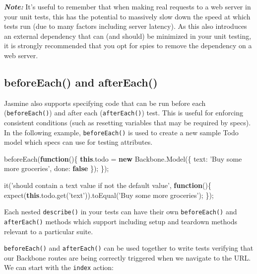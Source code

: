 \documentclass[9pt]{book}
\newenvironment{Shaded}{}{}
\newcommand{\KeywordTok}[1]{\textcolor[rgb]{0.00,0.44,0.13}{\textbf{{#1}}}}
\newcommand{\DataTypeTok}[1]{\textcolor[rgb]{0.56,0.13,0.00}{{#1}}}
\newcommand{\StringTok}[1]{\textcolor[rgb]{0.25,0.44,0.63}{{#1}}}
\newcommand{\OtherTok}[1]{\textcolor[rgb]{0.00,0.44,0.13}{{#1}}}
\newcommand{\FunctionTok}[1]{\textcolor[rgb]{0.02,0.16,0.49}{{#1}}}
\newcommand{\NormalTok}[1]{{#1}}
\begin{document}
\textbf{\emph{Note:}} It's useful to remember that when making real
requests to a web server in your unit tests, this has the potential to
massively slow down the speed at which tests run (due to many factors
including server latency). As this also introduces an external
dependency that can (and should) be minimized in your unit testing, it
is strongly recommended that you opt for spies to remove the dependency
on a web server.

\subsection{beforeEach() and
afterEach()}\label{beforeeach-and-aftereach}

Jasmine also supports specifying code that can be run before each
(\texttt{beforeEach()}) and after each (\texttt{afterEach()}) test. This
is useful for enforcing consistent conditions (such as resetting
variables that may be required by specs). In the following example,
\texttt{beforeEach()} is used to create a new sample Todo model which
specs can use for testing attributes.

\begin{Shaded}
\begin{Highlighting}[]
\FunctionTok{beforeEach}\NormalTok{(}\KeywordTok{function}\NormalTok{()\{}
   \KeywordTok{this}\NormalTok{.}\FunctionTok{todo} \NormalTok{= }\KeywordTok{new} \OtherTok{Backbone}\NormalTok{.}\FunctionTok{Model}\NormalTok{(\{}
      \DataTypeTok{text}\NormalTok{: }\StringTok{'Buy some more groceries'}\NormalTok{,}
      \DataTypeTok{done}\NormalTok{: }\KeywordTok{false}
   \NormalTok{\});}
\NormalTok{\});}

\FunctionTok{it}\NormalTok{(}\StringTok{'should contain a text value if not the default value'}\NormalTok{, }\KeywordTok{function}\NormalTok{()\{}
   \FunctionTok{expect}\NormalTok{(}\KeywordTok{this}\NormalTok{.}\OtherTok{todo}\NormalTok{.}\FunctionTok{get}\NormalTok{(}\StringTok{'text'}\NormalTok{)).}\FunctionTok{toEqual}\NormalTok{(}\StringTok{'Buy some more groceries'}\NormalTok{);}
\NormalTok{\});}
\end{Highlighting}
\end{Shaded}

Each nested \texttt{describe()} in your tests can have their own
\texttt{beforeEach()} and \texttt{afterEach()} methods which support
including setup and teardown methods relevant to a particular suite.

\texttt{beforeEach()} and \texttt{afterEach()} can be used together to
write tests verifying that our Backbone routes are being correctly
triggered when we navigate to the URL. We can start with the
\texttt{index} action:
\end{document}
